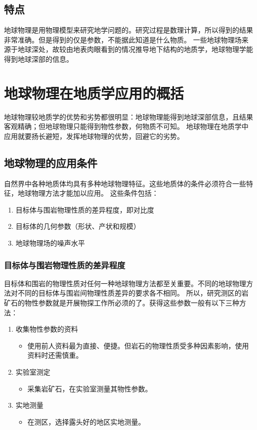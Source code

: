 \documentclass[hyperref,UTF-8]{ctexart}
\begin{document}
\subsection{特点}
地球物理是用物理模型来研究地学问题的。研究过程是数理计算，所以得到的结果非常准确。但是得到的仅是参数，不能据此知道是什么物质。
一些地球物理场来源于地球深处，故较由地表肉眼看到的情况推导地下结构的地质学，地球物理学能得到地球深部的信息。
\section{地球物理在地质学应用的概括}
地球物理较地质学的优势和劣势都很明显：地球物理能得到地球深部信息，且结果客观精确；但地球物理只能得到物性参数，何物质不可知。
地球物理在地质学中应用就要扬长避短，发挥地球物理的优势，回避它的劣势。
\subsection{地球物理的应用条件}
自然界中各种地质体均具有多种地球物理特征。这些地质体的条件必须符合一些特征，地球物理方法才能加以应用。
这些条件包括：

\begin{enumerate}
\item 目标体与围岩物理性质的差异程度，即对比度
\item 目标体的几何参数（形状、产状和规模）
\item 地球物理场的噪声水平
\end{enumerate}
\subsubsection{目标体与围岩物理性质的差异程度}
目标体和围岩的物理性质对任何一种地球物理方法都至关重要。不同的地球物理方法对不同的目标体与围岩间物理性质差异的要求各不相同。
所以，研究测区的岩矿石的物性参数就是开展物探工作所必须的了。获得这些参数一般有以下三种方法：
\begin{enumerate}
\item 收集物性参数的资料
\begin{itemize}
\item 使用前人资料最为直接、便捷。但岩石的物理性质受多种因素影响，使用资料时还需慎重。
\end{itemize}
\item 实验室测定
\begin{itemize}
\item 采集岩矿石，在实验室测量其物性参数。
\end{itemize}
\item 实地测量
\begin{itemize}
\item 在测区，选择露头好的地区实地测量。
\end{itemize}
\end{enumerate}
\end{document}
